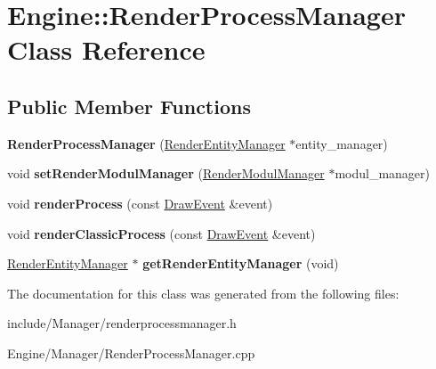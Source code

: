 \hypertarget{classEngine_1_1RenderProcessManager}{}\section{Engine\+:\+:Render\+Process\+Manager Class Reference}
\label{classEngine_1_1RenderProcessManager}
\subsection*{Public Member Functions}
\begin{DoxyCompactItemize}
\item 
\hypertarget{classEngine_1_1RenderProcessManager_a48f095abe235bed49d5cb2e818efbfa0}{}{\bfseries Render\+Process\+Manager} (\hyperlink{classEngine_1_1RenderEntityManager}{Render\+Entity\+Manager} $\ast$entity\+\_\+manager)\label{classEngine_1_1RenderProcessManager_a48f095abe235bed49d5cb2e818efbfa0}

\item 
\hypertarget{classEngine_1_1RenderProcessManager_aa779a6d142e4538f229f9406a3d57d0b}{}void {\bfseries set\+Render\+Modul\+Manager} (\hyperlink{classEngine_1_1RenderModulManager}{Render\+Modul\+Manager} $\ast$modul\+\_\+manager)\label{classEngine_1_1RenderProcessManager_aa779a6d142e4538f229f9406a3d57d0b}

\item 
\hypertarget{classEngine_1_1RenderProcessManager_a3d84b0597479997b7932348368478bdf}{}void {\bfseries render\+Process} (const \hyperlink{classEngine_1_1DrawEvent}{Draw\+Event} \&event)\label{classEngine_1_1RenderProcessManager_a3d84b0597479997b7932348368478bdf}

\item 
\hypertarget{classEngine_1_1RenderProcessManager_aab5b64ca332db3abf712dfbe86933317}{}void {\bfseries render\+Classic\+Process} (const \hyperlink{classEngine_1_1DrawEvent}{Draw\+Event} \&event)\label{classEngine_1_1RenderProcessManager_aab5b64ca332db3abf712dfbe86933317}

\item 
\hypertarget{classEngine_1_1RenderProcessManager_a4519441f6f25368ab753b0c804fe708b}{}\hyperlink{classEngine_1_1RenderEntityManager}{Render\+Entity\+Manager} $\ast$ {\bfseries get\+Render\+Entity\+Manager} (void)\label{classEngine_1_1RenderProcessManager_a4519441f6f25368ab753b0c804fe708b}

\end{DoxyCompactItemize}


The documentation for this class was generated from the following files\+:\begin{DoxyCompactItemize}
\item 
include/\+Manager/renderprocessmanager.\+h\item 
Engine/\+Manager/Render\+Process\+Manager.\+cpp\end{DoxyCompactItemize}
